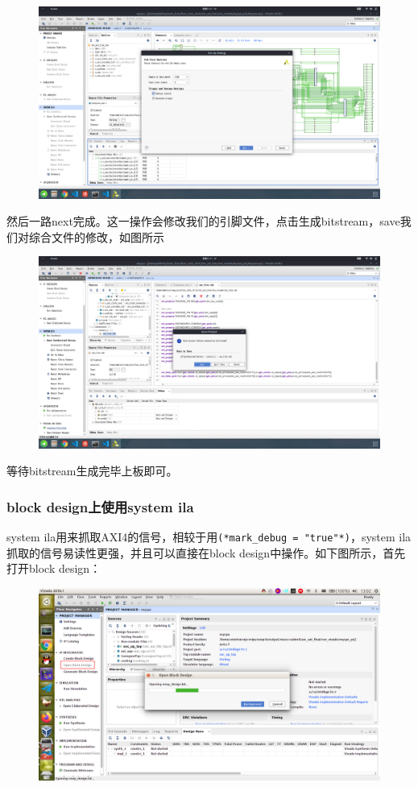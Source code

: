 \documentclass[lang=cn,11pt,a4paper]{elegantpaper}
\begin{document}
\begin{figure}[H]
\centering
\includegraphics[width=\linewidth]{image/mark_debug_3.png}
\end{figure}
然后一路next完成。这一操作会修改我们的引脚文件，点击生成bitstream，save我们对综合文件的修改，如图所示
\begin{figure}[H]
\centering
\includegraphics[width=\linewidth]{image/mark_debug_4.png}
\end{figure}
等待bitstream生成完毕上板即可。

\subsubsection{block design上使用system ila}

system ila用来抓取AXI4的信号，相较于用\lstinline!(*mark_debug = "true"*)!，system ila抓取的信号易读性更强，并且可以直接在block design中操作。如下图所示，首先打开block design：

\begin{figure}[H]
\centering
\includegraphics[width=\linewidth]{image/system_ila_1.png}
\end{figure}
\end{document}
